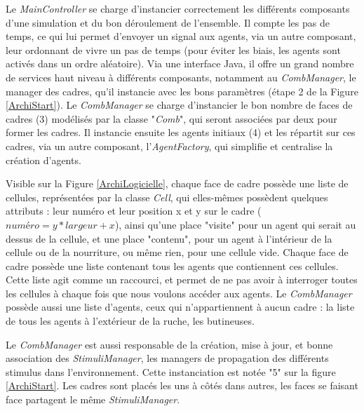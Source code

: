 			Le \textit{MainController} se charge d'instancier correctement les différents composants d'une simulation et du bon déroulement de l'ensemble. Il compte les pas de temps, ce qui lui permet d'envoyer un signal aux agents, via un autre composant, leur ordonnant de vivre un pas de temps (pour éviter les biais, les agents sont activés dans un ordre aléatoire). Via une interface Java, il offre un grand nombre de services haut niveau à différents composants, notamment au \textit{CombManager}, le manager des cadres, qu'il instancie avec les bons paramètres (étape 2 de la Figure \ref{ArchiStart}). Le \textit{CombManager} se charge d'instancier le bon nombre de faces de cadres (3) modélisés par la classe "\textit{Comb}", qui seront associées par deux pour former les cadres. Il instancie ensuite les agents initiaux (4) et les répartit sur ces cadres, via un autre composant, l'\textit{AgentFactory}, qui simplifie et centralise la création d'agents.
			
			Visible sur la Figure \ref{ArchiLogicielle}, chaque face de cadre possède une liste de cellules, représentées par la classe \textit{Cell}, qui elles-mêmes possèdent quelques attributs : leur numéro et leur position x et y sur le cadre ($numéro = y * largeur + x$), ainsi qu'une place "visite" pour un agent qui serait au dessus de la cellule, et une place "contenu", pour un agent à l'intérieur de la cellule ou de la nourriture, ou même rien, pour une cellule vide. Chaque face de cadre possède une liste contenant tous les agents que contiennent ces cellules. Cette liste agit comme un raccourci, et permet de ne pas avoir à interroger toutes les cellules à chaque fois que nous voulons accéder aux agents. Le \textit{CombManager} possède aussi une liste d'agents, ceux qui n'appartiennent à aucun cadre : la liste de tous les agents à l'extérieur de la ruche, les butineuses.
			
			Le \textit{CombManager} est aussi responsable de la création, mise à jour, et bonne association des \textit{StimuliManager}, les managers de propagation des différents stimulus dans l'environnement. Cette instanciation est notée "5" sur la figure \ref{ArchiStart}. Les cadres sont placés les uns à côtés dans autres, les faces se faisant face partagent le même \textit{StimuliManager}. 
			
